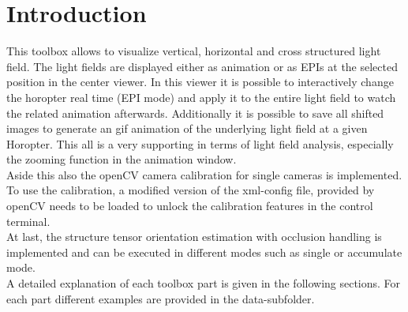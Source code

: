 %
\setlength{\parindent}{0em} 
%
%
\section{Introduction}
%
\vspace{4mm}
%
This toolbox allows to visualize vertical, horizontal and cross structured light field.
%
The light fields are displayed either as animation or as EPIs at the selected position in the center viewer.
%
In this viewer it is possible to interactively change the horopter real time (EPI mode) and apply it to the entire light field to watch the related animation afterwards.
%
Additionally it is possible to save all shifted images to generate an gif animation of the underlying light field at a given Horopter.
%
This all is a very supporting in terms of light field analysis, especially the zooming function in the animation window.\\
%
Aside this also the openCV camera calibration for single cameras is implemented.
%
To use the calibration, a modified version of the xml-config file, provided by openCV needs to be loaded to unlock the calibration features in the control terminal.\\
%
At last, the structure tensor orientation estimation with occlusion handling is implemented and can be executed in different modes such as single or accumulate mode.\\
%
A detailed explanation of each toolbox part is given in the following sections.
%
For each part different examples are provided in the data-subfolder.\\
%

% 
